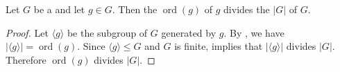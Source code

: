 \begin{corollary} \label{corollary:order_of_element_divides_order_of_finite_group}
    Let $G$ be a  and let $g \in G$. Then the  $\operatorname{ord}(g)$ of $g$ divides the  $|G|$ of $G$.
\end{corollary}
\begin{proof}
    Let $\langle g \rangle$ be the subgroup of $G$ generated by $g$. By , we have $|\langle g \rangle| = \operatorname{ord}(g)$. Since $\langle g \rangle \leq G$ and $G$ is finite,  implies that $|\langle g \rangle|$ divides $|G|$. Therefore $\operatorname{ord}(g)$ divides $|G|$.
\end{proof}
